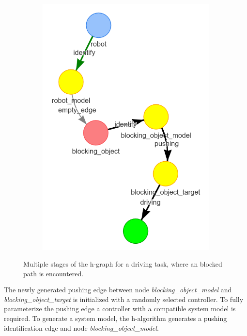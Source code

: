 \begin{figure}[H]
\begin{subfigure}{.3\textwidth}
    \caption{}\label{subfig:blocking_obj_2}
  \end{subfigure}
  \begin{subfigure}{.3\textwidth}
    \centering
    \includegraphics[width=\textwidth]{figures/proposed_method/connecting_nodes/blocking_obj/blocking_obj_3}
    \caption{}\label{subfig:blocking_obj_3}
  \end{subfigure}

  \caption{Multiple stages of the \ac{h-graph} for a driving task, where an blocked path is encountered.}%
  \label{fig:blocking_obj_h-graph_one}

\end{figure}

The newly generated pushing edge between node \textit{blocking\_object\_model} and \textit{blocking\_object\_target} is initialized with a randomly selected controller. To fully parameterize the pushing edge a controller with a compatible system model is required. To generate a system model, the \ac{h-algorithm} generates a pushing identification edge and node \textit{blocking\_object\_model}.\bs

